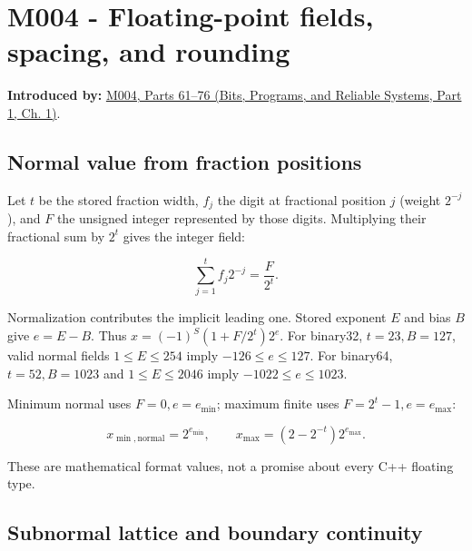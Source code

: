 \section{M004 - Floating-point fields, spacing, and rounding}\label{03-visual-computing-i-ch018-m004---floating-point-fields-spacing-and-rounding}

\hypertarget{03-visual-computing-i-ch018-m004---floating-point-fields-spacing-and-rounding}{}

\textbf{Introduced by:} \href{../01-Bits-Programs-and-Reliable-Systems-P01/main.pdf\#01-foundations-i-ch001-a-stretching-ruler-for-real-valued-quantities}{M004, Parts 61--76 (Bits, Programs, and Reliable Systems, Part 1, Ch. 1)}.

\subsection{Normal value from fraction positions}\label{03-visual-computing-i-ch018-normal-value-from-fraction-positions}

\hypertarget{03-visual-computing-i-ch018-normal-value-from-fraction-positions}{}

Let \(t\) be the stored fraction width, \(f_j\) the digit at fractional position \(j\) (weight \(2^{-j}\)), and \(F\) the unsigned integer represented by those digits. Multiplying their fractional sum by \(2^t\) gives the integer field:

\[
\sum_{j=1}^{t}f_j2^{-j}=\frac{F}{2^t}.
\]

Normalization contributes the implicit leading one. Stored exponent \(E\) and bias \(B\) give \(e=E-B\). Thus \(x=(-1)^S(1+F/2^t)2^e\). For binary32, \(t=23,B=127\), valid normal fields \(1\le E\le254\) imply \(-126\le e\le127\). For binary64, \(t=52,B=1023\) and \(1\le E\le2046\) imply \(-1022\le e\le1023\).

Minimum normal uses \(F=0,e=e_{\min}\); maximum finite uses \(F=2^t-1,e=e_{\max}\):

\[
x_{\min,\mathrm{normal}}=2^{e_{\min}},\qquad
x_{\max}=(2-2^{-t})2^{e_{\max}}.
\]

These are mathematical format values, not a promise about every C++ floating type.

\subsection{Subnormal lattice and boundary continuity}\label{03-visual-computing-i-ch018-subnormal-lattice-and-boundary-continuity}

